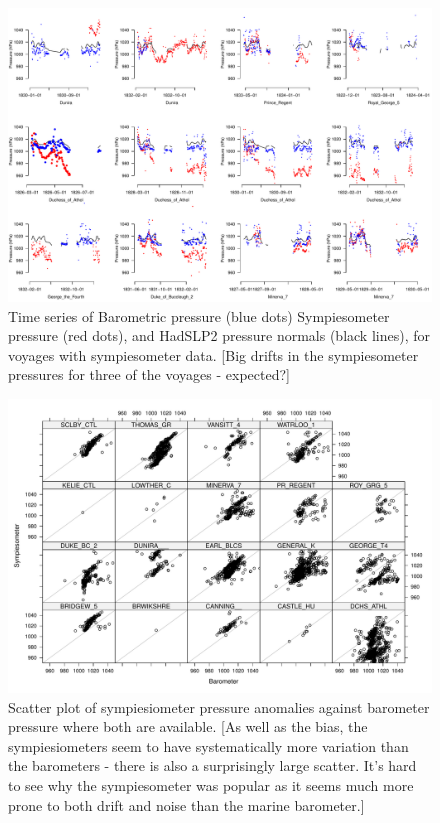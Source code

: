 \documentclass[a4paper,11pt]{article}
\begin{document}
\begin{figure}
\begin{center}
\includegraphics[angle=0, width=1.0\textwidth]{../sympiesometer/sym_v_normal_ts}
\caption{Time series of Barometric pressure (blue dots) Sympiesometer pressure (red dots), and HadSLP2 pressure normals (black lines), for voyages with sympiesometer data. [Big drifts in the sympiesometer pressures for three of the voyages - expected?]}
\label{sym_v_normal_ts}
\end{center}
\end{figure}

\begin{figure}
\begin{center}
\includegraphics[angle=0, width=1.0\textwidth]{../sympiesometer/sym_v_pre}
\caption{Scatter plot of sympiesiometer pressure anomalies against barometer pressure where both are available. [As well as the bias, the sympiesiometers seem to have systematically more variation than the barometers - there is also a surprisingly large scatter. It's hard to see why the sympiesometer was popular as it seems much more prone to both drift and noise than the marine barometer.]}
\label{sym_v_pre}
\end{center}
\end{figure}
\end{document}
